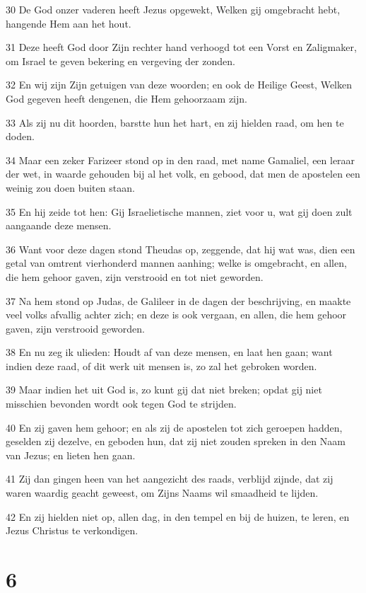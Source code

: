 \par 30 De God onzer vaderen heeft Jezus opgewekt, Welken gij omgebracht hebt, hangende Hem aan het hout.
\par 31 Deze heeft God door Zijn rechter hand verhoogd tot een Vorst en Zaligmaker, om Israel te geven bekering en vergeving der zonden.
\par 32 En wij zijn Zijn getuigen van deze woorden; en ook de Heilige Geest, Welken God gegeven heeft dengenen, die Hem gehoorzaam zijn.
\par 33 Als zij nu dit hoorden, barstte hun het hart, en zij hielden raad, om hen te doden.
\par 34 Maar een zeker Farizeer stond op in den raad, met name Gamaliel, een leraar der wet, in waarde gehouden bij al het volk, en gebood, dat men de apostelen een weinig zou doen buiten staan.
\par 35 En hij zeide tot hen: Gij Israelietische mannen, ziet voor u, wat gij doen zult aangaande deze mensen.
\par 36 Want voor deze dagen stond Theudas op, zeggende, dat hij wat was, dien een getal van omtrent vierhonderd mannen aanhing; welke is omgebracht, en allen, die hem gehoor gaven, zijn verstrooid en tot niet geworden.
\par 37 Na hem stond op Judas, de Galileer in de dagen der beschrijving, en maakte veel volks afvallig achter zich; en deze is ook vergaan, en allen, die hem gehoor gaven, zijn verstrooid geworden.
\par 38 En nu zeg ik ulieden: Houdt af van deze mensen, en laat hen gaan; want indien deze raad, of dit werk uit mensen is, zo zal het gebroken worden.
\par 39 Maar indien het uit God is, zo kunt gij dat niet breken; opdat gij niet misschien bevonden wordt ook tegen God te strijden.
\par 40 En zij gaven hem gehoor; en als zij de apostelen tot zich geroepen hadden, geselden zij dezelve, en geboden hun, dat zij niet zouden spreken in den Naam van Jezus; en lieten hen gaan.
\par 41 Zij dan gingen heen van het aangezicht des raads, verblijd zijnde, dat zij waren waardig geacht geweest, om Zijns Naams wil smaadheid te lijden.
\par 42 En zij hielden niet op, allen dag, in den tempel en bij de huizen, te leren, en Jezus Christus te verkondigen.

\chapter{6}

